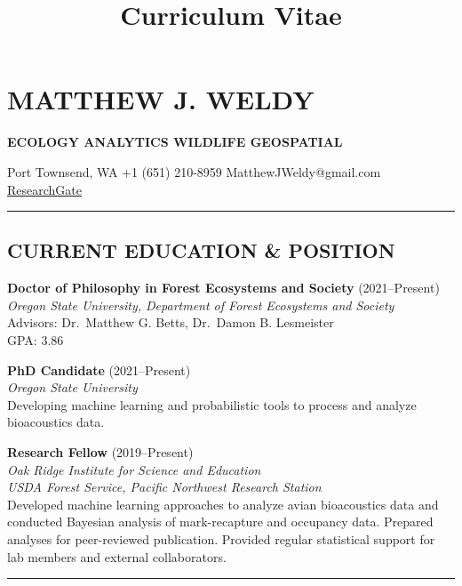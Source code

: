 \documentclass[
  11pt,
  letterpaper,
  DIV=11,
  numbers=noendperiod]{scrartcl}
\title{Curriculum Vitae}
\author{}
\date{}
\begin{document}
\maketitle


\section{MATTHEW J. WELDY}\label{matthew-j.-weldy}

\textbf{ECOLOGY \textbar{} ANALYTICS \textbar{} WILDLIFE \textbar{}
GEOSPATIAL}

Port Townsend, WA \textbar{} +1 (651) 210-8959 \textbar{}
MatthewJWeldy@gmail.com \textbar{}
\href{https://www.researchgate.net/profile/Matthew-Weldy}{ResearchGate}

\begin{center}\rule{0.5\linewidth}{0.5pt}\end{center}

\subsection{CURRENT EDUCATION \&
POSITION}\label{current-education-position}

\textbf{Doctor of Philosophy in Forest Ecosystems and Society}
(2021--Present)\\
\emph{Oregon State University, Department of Forest Ecosystems and
Society}\\
Advisors: Dr.~Matthew G. Betts, Dr.~Damon B. Lesmeister\\
GPA: 3.86

\textbf{PhD Candidate} (2021--Present)\\
\emph{Oregon State University}\\
Developing machine learning and probabilistic tools to process and
analyze bioacoustics data.

\textbf{Research Fellow} (2019--Present)\\
\emph{Oak Ridge Institute for Science and Education}\\
\emph{USDA Forest Service, Pacific Northwest Research Station}\\
Developed machine learning approaches to analyze avian bioacoustics data
and conducted Bayesian analysis of mark-recapture and occupancy data.
Prepared analyses for peer-reviewed publication. Provided regular
statistical support for lab members and external collaborators.

\begin{center}\rule{0.5\linewidth}{0.5pt}\end{center}
\end{document}
